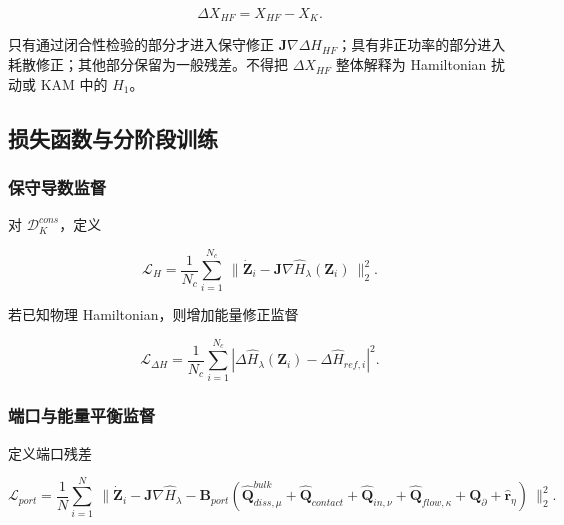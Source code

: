 \begin{equation}
\label{eq:chnn-4-22}
\Delta X_{HF} = X_{HF} - X_{K}.
\end{equation}

只有通过闭合性检验的部分才进入保守修正 \(\mathbf{J}\nabla\Delta H_{HF}\)；具有非正功率的部分进入耗散修正；其他部分保留为一般残差。不得把 \(\Delta X_{HF}\) 整体解释为 Hamiltonian 扰动或 KAM 中的 \(H_{1}\)。

\subsection{损失函数与分阶段训练}\label{sec:chnn-4-5}

\subsubsection{保守导数监督}\label{sec:chnn-4-5-1}

对 \(\mathcal{D}_{K}^{cons}\)，定义

\begin{equation}
\label{eq:chnn-4-23}
\mathcal{L}_{H} = \frac{1}{N_{c}}\sum_{i = 1}^{N_{c}}\left. \  \parallel {\dot{\mathbf{Z}}}_{i} - \mathbf{J}\nabla{\widehat{H}}_{\lambda}\left( \mathbf{Z}_{i} \right) \right.\  \parallel_{2}^{2}.
\end{equation}

若已知物理 Hamiltonian，则增加能量修正监督

\begin{equation}
\label{eq:chnn-4-24}
\mathcal{L}_{\Delta H} = \frac{1}{N_{c}}\sum_{i = 1}^{N_{c}}\left| \Delta{\widehat{H}}_{\lambda}\left( \mathbf{Z}_{i} \right) - \Delta{\widehat{H}}_{ref,i} \right|^{2}.
\end{equation}

\subsubsection{端口与能量平衡监督}\label{sec:chnn-4-5-2}

定义端口残差

\begin{equation}
\label{eq:chnn-4-25}
\mathcal{L}_{port} = \frac{1}{N}\sum_{i = 1}^{N}\left. \  \parallel {\dot{\mathbf{Z}}}_{i} - \mathbf{J}\nabla{\widehat{H}}_{\lambda} - \mathbf{B}_{port}\left( {\widehat{\mathbf{Q}}}_{diss,\mu}^{bulk} + {\widehat{\mathbf{Q}}}_{contact} + {\widehat{\mathbf{Q}}}_{in,\nu} + {\widehat{\mathbf{Q}}}_{flow,\kappa} + \mathbf{Q}_{\partial} + {\widehat{\mathbf{r}}}_{\eta} \right) \right.\  \parallel_{2}^{2}.
\end{equation}

